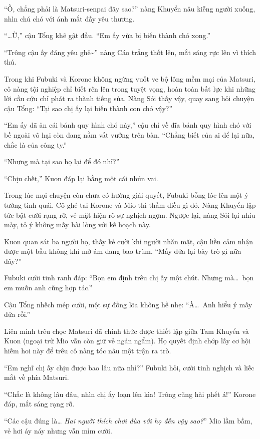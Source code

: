 \documentclass[../main.tex]{subfiles}
\begin{document}
``Ồ, chẳng phải là Matsuri-senpai đây sao?'' nàng Khuyển nâu kiễng người xuống, nhìn chú chó với ánh mắt đầy yêu thương.

``\dots Ừ,'' cậu Tổng khẽ gật đầu. ``Em ấy vừa bị biến thành chó xong.''

``Trông cậu ấy đáng yêu ghê\~{}'' nàng Cáo trắng thốt lên, mắt sáng rực lên vì thích thú.

Trong khi Fubuki và Korone không ngừng vuốt ve bộ lông mềm mại của Matsuri, cô nàng tội nghiệp chỉ biết rên lên trong tuyệt vọng, hoàn toàn bất lực khi những lời cầu cứu chỉ phát ra thành tiếng sủa. Nàng Sói thấy vậy, quay sang hỏi chuyện cậu Tổng: ``Tại sao chị ấy lại biến thành con chó vậy?''

``Em ấy đã ăn cái bánh quy hình chó này,'' cậu chỉ về đĩa bánh quy hình chó với bề ngoài vô hại còn đang nằm vất vưởng trên bàn. ``Chẳng biết của ai để lại nữa, chắc là của công ty.''

``Nhưng mà tại sao họ lại để đó nhỉ?''

``Chịu chết,'' Kuon đáp lại bằng một cái nhún vai.

Trong lúc mọi chuyện còn chưa có hướng giải quyết, Fubuki bỗng lóe lên một ý tưởng tinh quái. Cô ghé tai Korone và Mio thì thầm điều gì đó. Nàng Khuyển lập tức bật cười rạng rỡ, vẻ mặt hiện rõ sự nghịch ngợm. Ngược lại, nàng Sói lại nhíu mày, tỏ ý không mấy hài lòng với kế hoạch này.

Kuon quan sát ba người họ, thấy kẻ cười khì người nhăn mặt, cậu liền cảm nhận được một bầu không khí mờ ám đang bao trùm. ``Mấy đứa lại bày trò gì nữa đây?''

Fubuki cười tinh ranh đáp: ``Bọn em định trêu chị ấy một chút. Nhưng mà\dots\ bọn em muốn anh cũng hợp tác.''

Cậu Tổng nhếch mép cười, một sự đồng lõa không hề nhẹ: ``À\dots\ Anh hiểu ý mấy đứa rồi.''

\ct


Liên minh trêu chọc Matsuri đã chính thức được thiết lập giữa Tam Khuyển và Kuon (ngoại trừ Mio vẫn còn giữ vẻ ngán ngẩm). Họ quyết định chớp lấy cơ hội hiếm hoi này để trêu cô nàng tóc nâu một trận ra trò.

``Em nghĩ chị ấy chịu được bao lâu nữa nhỉ?'' Fubuki hỏi, cười tinh nghịch và liếc mắt về phía Matsuri.

``Chắc là không lâu đâu, nhìn chị ấy loạn lên kìa! Trông cũng hài phết á!'' Korone đáp, mắt sáng rạng rỡ.

``Các cậu đúng là\dots{} \textit{Hai người thích chơi đùa với họ đến vậy sao?}'' Mio lầm bầm, vẻ hơi áy náy nhưng vẫn mỉm cười.
\end{document}
